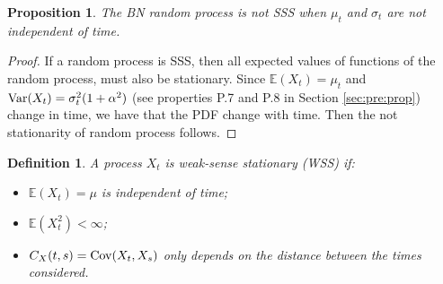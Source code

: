 \documentclass[12pt]{article}
\newtheorem{proposition}[theorem]{Proposition}
\newtheorem{definition}[theorem]{Definition}
\theoremstyle{definition}
\begin{document}
\begin{proposition}\label{not-SSS}
The BN random process is not SSS when $\mu_t$ and $\sigma_t$ are not independent of time.
\end{proposition}
\begin{proof}
If a random process is SSS, then all expected values of functions of the random process, must also be stationary. Since $\mathbb{E}(X_t)=\mu_t$ and ${\rm Var}(X_t)=\sigma^2_t(1+\alpha^2)$ (see properties P.7 and P.8 in Section \ref{sec:pre:prop}) change in time, we have that the PDF change with time. Then the not stationarity of random process follows.
%	
\end{proof}

\begin{definition}
A process $X_t$ is weak-sense stationary (WSS) if:
\begin{itemize}
\item $\mathbb{E}(X_t)=\mu$  is independent of time;
\item $\mathbb{E}(X_t^2)<\infty$;
\item $C_X(t,s)={\rm Cov}(X_t,X_s)$ only depends on the distance 
between the times considered.
\end{itemize}
\end{definition}
\end{document}
